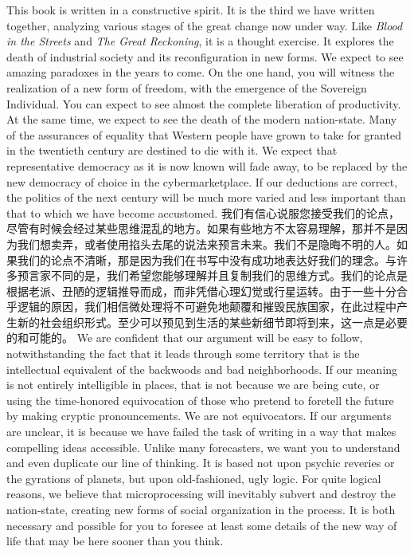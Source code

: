 \begin{paracol}{2}
\switchcolumn
This book is written in a constructive spirit. It is the third we have written together, analyzing various stages of the great change now under way. Like \emph{Blood in the Streets} and \emph{The Great Reckoning}, it is a thought exercise. It explores the death of industrial society and its reconfiguration in new forms. We expect to see amazing paradoxes in the years to come. On the one hand, you will witness the realization of a new form of freedom, with the emergence of the Sovereign Individual. You can expect to see almost the complete liberation of productivity. At the same time, we expect to see the death of the modern nation-state. Many of the assurances of equality that Western people have grown to take for granted in the twentieth century are destined to die with it. We expect that representative democracy as it is now known will fade away, to be replaced by the new democracy of choice in the cybermarketplace. If our deductions are correct, the politics of the next century will be much more varied and less important than that to which we have become accustomed.
\switchcolumn*
我们有信心说服您接受我们的论点，尽管有时候会经过某些思维混乱的地方。如果有些地方不太容易理解，那并不是因为我们想卖弄，或者使用掐头去尾的说法来预言未来。我们不是隐晦不明的人。如果我们的论点不清晰，那是因为我们在书写中没有成功地表达好我们的理念。与许多预言家不同的是，我们希望您能够理解并且复制我们的思维方式。我们的论点是根据老派、丑陋的逻辑推导而成，而非凭借心理幻觉或行星运转。由于一些十分合乎逻辑的原因，我们相信微处理将不可避免地颠覆和摧毁民族国家，在此过程中产生新的社会组织形式。至少可以预见到生活的某些新细节即将到来，这一点是必要的和可能的。
\switchcolumn
We are confident that our argument will be easy to follow, notwithstanding the fact that it leads through some territory that is the intellectual equivalent of the backwoods and bad neighborhoods. If our meaning is not entirely intelligible in places, that is not because we are being cute, or using the time-honored equivocation of those who pretend to foretell the future by making cryptic pronouncements. We are not equivocators. If our arguments are unclear, it is because we have failed the task of writing in a way that makes compelling ideas accessible. Unlike many forecasters, we want you to understand and even duplicate our line of thinking. It is based not upon psychic reveries or the gyrations of planets, but upon old-fashioned, ugly logic. For quite logical reasons, we believe that microprocessing will inevitably subvert and destroy the nation-state, creating new forms of social organization in the process. It is both necessary and possible for you to foresee at least some details of the new way of life that may be here sooner than you think.
\end{paracol}

